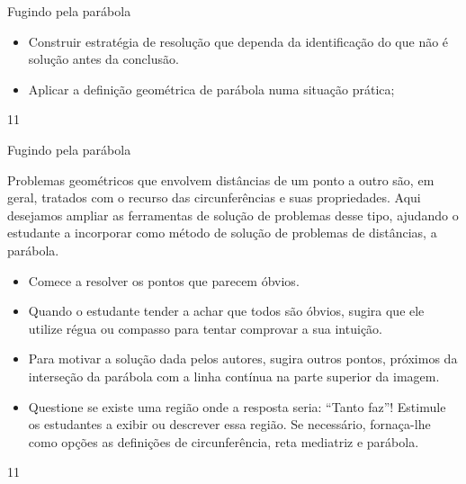 \clearpage
\def\currentcolor{session2}
\begin{objectives}{Fugindo pela parábola}
{
\begin{itemize}
\item Construir estratégia de resolução que dependa da identificação do que não é solução antes da conclusão.

\item {} 
Aplicar a definição geométrica de parábola numa situação prática;
\end{itemize}
}{1}{1}
\end{objectives}
\begin{sugestions}{Fugindo pela parábola}
{
Problemas geométricos que envolvem distâncias de um ponto a outro são, em geral, tratados com o recurso das circunferências e suas propriedades. Aqui desejamos ampliar as ferramentas de solução de problemas desse tipo, ajudando o estudante a incorporar como método de solução de problemas de distâncias, a parábola.
\begin{itemize}
\item {} 
Comece a resolver os pontos que parecem óbvios.

\item {} 
Quando o estudante tender a achar que todos são óbvios, sugira que ele utilize régua ou compasso para tentar comprovar a sua intuição.

\item {} 
Para motivar a solução dada pelos autores, sugira outros pontos, próximos da interseção da parábola com a linha contínua na parte superior da imagem.

\item {} 
Questione se existe uma região onde a resposta seria: “Tanto faz”! Estimule os estudantes a exibir ou descrever essa região. Se necessário, fornaça-lhe como opções as definições de circunferência, reta mediatriz e parábola.

\end{itemize}
}{1}{1}
\end{sugestions}
